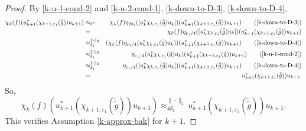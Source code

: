 \documentclass[12pt, oneside, psamsfonts]{amsart}
\theoremstyle{definition}
\theoremstyle{remark}
\numberwithin{equation}{section}
\newcommand{\norm}[1]{\| #1\|}
\newcommand{\eps}{\varepsilon}
\begin{document}
\begin{proof}
 By \eqref{k-u-1-cond-2} and \eqref{k-u-2-cond-1}, \eqref{k-down-to-D-3}, \eqref{k-down-to-D-4},
\begin{eqnarray*}
\chi_k(f) (u_{k+1}^*(\chi_{k+1, \eps_1}(\tilde{\tilde{g}}) )u_{k+1}) & \approx_{\delta''} & \chi_k(f) \eta_{2\delta_1}([u_k^*\chi_{k, \eps_1}(\tilde{\tilde{g}})u_k]) (u_{k+1}^*(\chi_{k+1, \eps_1}(\tilde{\tilde{g}}) )u_{k+1}) \quad \quad (\eqref{k-down-to-D-3}) \\
& = & \chi_k(f) \eta_{\eps_1/4}([u_k^*\chi_{k, \eps_1}(\tilde{\tilde{g}})u_k]) (u_{k+1}^*(\chi_{k+1, \eps_1}(\tilde{\tilde{g}}) )u_{k+1})\\
& \approx^{\norm{\cdot}_2}_{\delta_1} & (\chi_k(f) \eta_{\eps_1/4}(u_k^*\chi_{k, \eps_1}(\tilde{\tilde{g}})u_k)) (u_{k+1}^*(\chi_{k+1, \eps_1}(\tilde{\tilde{g}}) )u_{k+1}) \quad \quad (\eqref{k-down-to-D-4}) \\
& \approx^{\norm{\cdot}_2}_{\delta_1} & \eta_{\eps_1/4}(u_k^*\chi_{k, \eps_1}(\tilde{\tilde{g}})u_k) (u_{k+1}^*(\chi_{k+1, \eps_1}(\tilde{\tilde{g}}) )u_{k+1}) \quad \quad (\eqref{k-u-1-cond-2}) \\
& \approx^{\norm{\cdot}_2}_{\delta_1} & \eta_{\eps_1/4}([u_k^*\chi_{k, \eps_1}(\tilde{\tilde{g}})u_k]) (u_{k+1}^*(\chi_{k+1, \eps_1}(\tilde{\tilde{g}}) )u_{k+1}) \quad \quad (\eqref{k-down-to-D-4}) \\
& = & u_{k+1}^*(\chi_{k+1, \eps_1}(\tilde{\tilde{g}}) )u_{k+1}.
\end{eqnarray*}
So,
$$ \chi_k(f) (u_{k+1}^*(\chi_{k+1, \eps_1}(\tilde{\tilde{g}}) )u_{k+1}) \approx^{\norm{\cdot}_2}_{4\delta_1} u_{k+1}^*(\chi_{k+1, \eps_1}(\tilde{\tilde{g}}) )u_{k+1}.  $$
This verifies Assumption \eqref{k-approx-bak} for $k+1$.


\end{proof}
\end{document}
